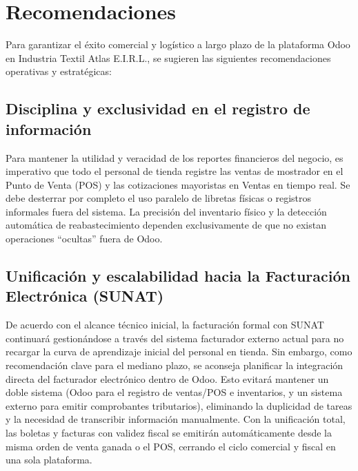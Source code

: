 \section{Recomendaciones}
\begin{indentedsubsection}
Para garantizar el éxito comercial y logístico a largo plazo de la plataforma Odoo en Industria Textil Atlas E.I.R.L., se sugieren las siguientes recomendaciones operativas y estratégicas:
\end{indentedsubsection}

\subsection{Disciplina y exclusividad en el registro de información}
\begin{indentedsubsection}
Para mantener la utilidad y veracidad de los reportes financieros del negocio, es imperativo que todo el personal de tienda registre las ventas de mostrador en el Punto de Venta (POS) y las cotizaciones mayoristas en Ventas en tiempo real. Se debe desterrar por completo el uso paralelo de libretas físicas o registros informales fuera del sistema. La precisión del inventario físico y la detección automática de reabastecimiento dependen exclusivamente de que no existan operaciones ``ocultas'' fuera de Odoo.
\end{indentedsubsection}

\subsection{Unificación y escalabilidad hacia la Facturación Electrónica (SUNAT)}
\begin{indentedsubsection}
De acuerdo con el alcance técnico inicial, la facturación formal con SUNAT continuará gestionándose a través del sistema facturador externo actual para no recargar la curva de aprendizaje inicial del personal en tienda. Sin embargo, como recomendación clave para el mediano plazo, se aconseja planificar la integración directa del facturador electrónico dentro de Odoo. Esto evitará mantener un doble sistema (Odoo para el registro de ventas/POS e inventarios, y un sistema externo para emitir comprobantes tributarios), eliminando la duplicidad de tareas y la necesidad de transcribir información manualmente. Con la unificación total, las boletas y facturas con validez fiscal se emitirán automáticamente desde la misma orden de venta ganada o el POS, cerrando el ciclo comercial y fiscal en una sola plataforma.
\end{indentedsubsection}


